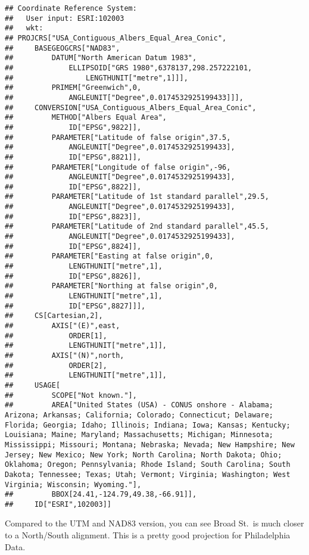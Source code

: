 \documentclass[
]{article}
\begin{document}
\begin{verbatim}
## Coordinate Reference System:
##   User input: ESRI:102003 
##   wkt:
## PROJCRS["USA_Contiguous_Albers_Equal_Area_Conic",
##     BASEGEOGCRS["NAD83",
##         DATUM["North American Datum 1983",
##             ELLIPSOID["GRS 1980",6378137,298.257222101,
##                 LENGTHUNIT["metre",1]]],
##         PRIMEM["Greenwich",0,
##             ANGLEUNIT["Degree",0.0174532925199433]]],
##     CONVERSION["USA_Contiguous_Albers_Equal_Area_Conic",
##         METHOD["Albers Equal Area",
##             ID["EPSG",9822]],
##         PARAMETER["Latitude of false origin",37.5,
##             ANGLEUNIT["Degree",0.0174532925199433],
##             ID["EPSG",8821]],
##         PARAMETER["Longitude of false origin",-96,
##             ANGLEUNIT["Degree",0.0174532925199433],
##             ID["EPSG",8822]],
##         PARAMETER["Latitude of 1st standard parallel",29.5,
##             ANGLEUNIT["Degree",0.0174532925199433],
##             ID["EPSG",8823]],
##         PARAMETER["Latitude of 2nd standard parallel",45.5,
##             ANGLEUNIT["Degree",0.0174532925199433],
##             ID["EPSG",8824]],
##         PARAMETER["Easting at false origin",0,
##             LENGTHUNIT["metre",1],
##             ID["EPSG",8826]],
##         PARAMETER["Northing at false origin",0,
##             LENGTHUNIT["metre",1],
##             ID["EPSG",8827]]],
##     CS[Cartesian,2],
##         AXIS["(E)",east,
##             ORDER[1],
##             LENGTHUNIT["metre",1]],
##         AXIS["(N)",north,
##             ORDER[2],
##             LENGTHUNIT["metre",1]],
##     USAGE[
##         SCOPE["Not known."],
##         AREA["United States (USA) - CONUS onshore - Alabama; Arizona; Arkansas; California; Colorado; Connecticut; Delaware; Florida; Georgia; Idaho; Illinois; Indiana; Iowa; Kansas; Kentucky; Louisiana; Maine; Maryland; Massachusetts; Michigan; Minnesota; Mississippi; Missouri; Montana; Nebraska; Nevada; New Hampshire; New Jersey; New Mexico; New York; North Carolina; North Dakota; Ohio; Oklahoma; Oregon; Pennsylvania; Rhode Island; South Carolina; South Dakota; Tennessee; Texas; Utah; Vermont; Virginia; Washington; West Virginia; Wisconsin; Wyoming."],
##         BBOX[24.41,-124.79,49.38,-66.91]],
##     ID["ESRI",102003]]
\end{verbatim}

Compared to the UTM and NAD83 version, you can see Broad St.~is much
closer to a North/South alignment. This is a pretty good projection for
Philadelphia Data.
\end{document}
